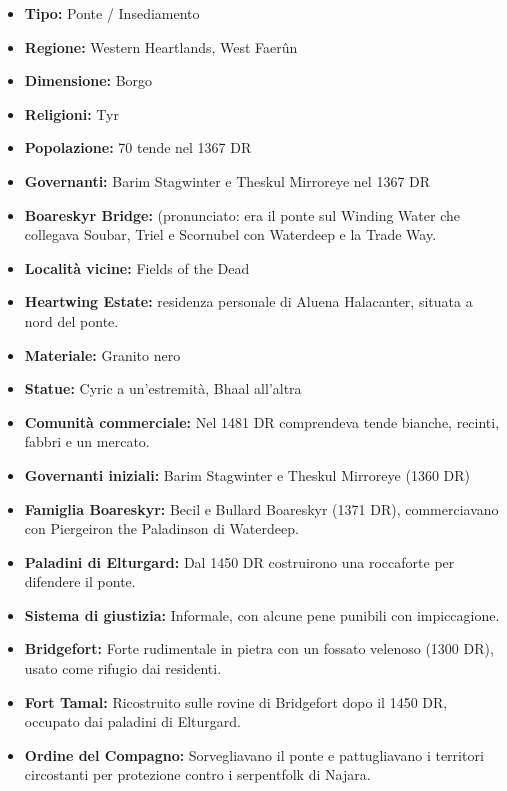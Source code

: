 \documentclass{article}
\begin{document}
                \begin{itemize}
                    \item \textbf{Tipo:} Ponte / Insediamento
                    \item \textbf{Regione:} Western Heartlands, West Faer\^un
                    \item \textbf{Dimensione:} Borgo
                    \item \textbf{Religioni:} Tyr
                    \item \textbf{Popolazione:} 70 tende nel 1367 DR
                    \item \textbf{Governanti:} Barim Stagwinter e Theskul Mirroreye nel 1367 DR
                    \item \textbf{Boareskyr Bridge:} (pronunciato:  era il ponte sul Winding Water che collegava Soubar, Triel e Scornubel con Waterdeep e la Trade Way.
                    \item \textbf{Località vicine:} Fields of the Dead
                    \item \textbf{Heartwing Estate:} residenza personale di Aluena Halacanter, situata a nord del ponte.
                    \item \textbf{Materiale:} Granito nero
                    \item \textbf{Statue:} Cyric a un'estremità, Bhaal all'altra
                    \item \textbf{Comunità commerciale:} Nel 1481 DR comprendeva tende bianche, recinti, fabbri e un mercato.
                    \item \textbf{Governanti iniziali:} Barim Stagwinter e Theskul Mirroreye (1360 DR)
                    \item \textbf{Famiglia Boareskyr:} Becil e Bullard Boareskyr (1371 DR), commerciavano con Piergeiron the Paladinson di Waterdeep.
                    \item \textbf{Paladini di Elturgard:} Dal 1450 DR costruirono una roccaforte per difendere il ponte.
                    \item \textbf{Sistema di giustizia:} Informale, con alcune pene punibili con impiccagione.
                    \item \textbf{Bridgefort:} Forte rudimentale in pietra con un fossato velenoso (1300 DR), usato come rifugio dai residenti.
                    \item \textbf{Fort Tamal:} Ricostruito sulle rovine di Bridgefort dopo il 1450 DR, occupato dai paladini di Elturgard.
                    \item \textbf{Ordine del Compagno:} Sorvegliavano il ponte e pattugliavano i territori circostanti per protezione contro i serpentfolk di Najara.

\end{itemize}
\end{document}
